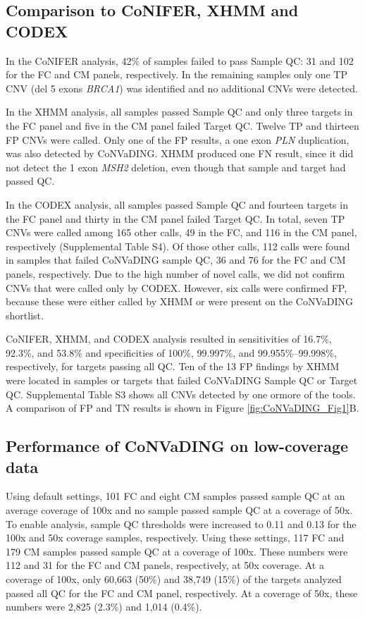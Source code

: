 \subsection{Comparison to CoNIFER, XHMM and CODEX}
In the CoNIFER analysis, 42\% of samples failed to pass Sample QC: 31 and 102 for the FC and CM panels, respectively. 
In the remaining samples only one TP CNV (del 5 exons \textsl{BRCA1}) was identified and no additional CNVs were detected. 

In the XHMM analysis, all samples passed Sample QC and only three targets in the FC panel and five in the CM panel failed Target QC. 
Twelve TP and thirteen FP CNVs were called. 
Only one of the FP results, a one exon \textsl{PLN} duplication, was also detected by CoNVaDING. 
XHMM produced one FN result, since it did not detect the 1 exon \textsl{MSH2} deletion, even though that sample and target had passed QC. 

In the CODEX analysis, all samples passed Sample QC and fourteen targets in the FC panel and thirty in the CM panel failed Target QC. 
In total, seven TP CNVs were called among 165 other calls, 49 in the FC, and 116 in the CM panel, respectively (Supplemental Table S4). 
Of those other calls, 112 calls were found in samples that failed CoNVaDING sample QC, 36 and 76 for the FC and CM panels, respectively. 
Due to the high number of novel calls, we did not confirm CNVs that were called only by CODEX. 
However, six calls were confirmed FP, because these were either called by XHMM or were present on the CoNVaDING shortlist. 

CoNIFER, XHMM, and CODEX analysis resulted in sensitivities of 16.7\%, 92.3\%, and 53.8\% and specificities of 100\%, 99.997\%, and 99.955\%–99.998\%, respectively, for targets passing all QC. 
Ten of the 13 FP findings by XHMM were located in samples or targets that failed CoNVaDING Sample QC or Target QC. 
Supplemental Table S3 shows all CNVs detected by one ormore of the tools. 
A comparison of FP and TN results is shown in Figure  \ref{fig:CoNVaDING_Fig1}B.



\subsection{Performance of CoNVaDING on low-coverage data}
Using default settings, 101 FC and eight CM samples passed
sample QC at an average coverage of 100x and no sample passed sample QC at a coverage of 50x. 
To enable analysis, sample QC thresholds were increased to 0.11 and 0.13 for the 100x and 50x coverage samples, respectively.
Using these settings, 117 FC and 179 CM samples passed sample QC at a coverage of 100x. 
These numbers were 112 and 31 for the FC and CM panels, respectively, at 50x coverage. 
At a coverage of 100x, only 60,663 (50\%) and 38,749 (15\%) of the targets analyzed passed all QC for the FC and CM panel, respectively. 
At a coverage of 50x, these numbers were 2,825 (2.3\%) and 1,014 (0.4\%). 

